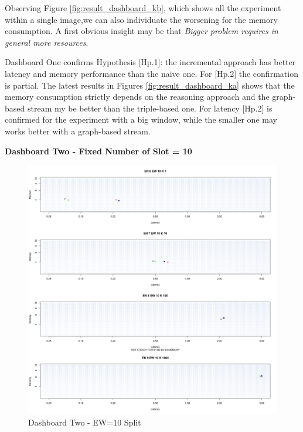 Observing Figure \ref{fig:result_dashboard_kb}, which shows all the experiment within a single image,we can also individuate the worsening for the memory consumption. A first obvious insight may be that \textit{Bigger problem requires in general more resources}. %

Dashboard One confirms Hypothesis [Hp.1]: the incremental approach has better latency and memory performance than the naive one. For [Hp.2] the confirmation is partial. The latest results in Figures \ref{fig:result_dashboard_ka} shows that the memory consumption strictly depends on the reasoning approach and the graph-based stream my be better than the triple-based one. For latency [Hp.2] is confirmed for the experiment with a big window, while the smaller one may works better with a graph-based stream.


\textbf{Dashboard Two - Fixed Number of Slot = 10}


\begin{figure}[htb]
	\centering
	\includegraphics[width=0.90\linewidth]{images/dashboard-2-split}	
	\caption[\textsc{Analyser} Investigation Stack - Level 0 - Dashboard Two - Split Version]{Dashboard Two - EW=10 Split} 
	\label{fig:result_dashboard_ewa}
\end{figure}

